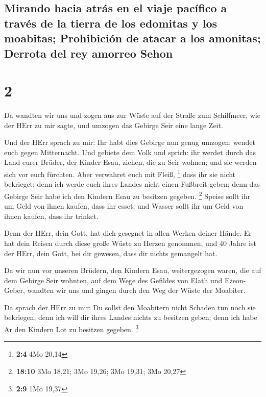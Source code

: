 \hypertarget{mirando-hacia-atruxe1s-en-el-viaje-pacuxedfico-a-travuxe9s-de-la-tierra-de-los-edomitas-y-los-moabitas-prohibiciuxf3n-de-atacar-a-los-amonitas-derrota-del-rey-amorreo-sehon}{%
\subsection{Mirando hacia atrás en el viaje pacífico a través de la
tierra de los edomitas y los moabitas; Prohibición de atacar a los
amonitas; Derrota del rey amorreo
Sehon}\label{mirando-hacia-atruxe1s-en-el-viaje-pacuxedfico-a-travuxe9s-de-la-tierra-de-los-edomitas-y-los-moabitas-prohibiciuxf3n-de-atacar-a-los-amonitas-derrota-del-rey-amorreo-sehon}}

\hypertarget{section-1}{%
\section{2}\label{section-1}}

 Da wandten wir uns und zogen aus zur Wüste auf der Straße
zum Schilfmeer, wie der HErr zu mir sagte, und umzogen das Gebirge Seir
eine lange Zeit.

 Und der HErr sprach zu mir:  Ihr habt dies
Gebirge nun genug umzogen; wendet euch gegen Mitternacht. 
Und gebiete dem Volk und sprich: ihr werdet durch das Land eurer Brüder,
der Kinder Esau, ziehen, die zu Seir wohnen; und sie werden sich vor
euch fürchten. Aber verwahret euch mit Fleiß, \footnote{\textbf{2:4} 4Mo
  20,14}  dass ihr sie nicht bekrieget; denn ich werde
euch ihres Landes nicht einen Fußbreit geben; denn das Gebirge Seir habe
ich den Kindern Esau zu besitzen gegeben. \footnote{\textbf{18:10} 3Mo
  18,21; 3Mo 19,26; 3Mo 19,31; 3Mo 20,27}  Speise sollt
ihr um Geld von ihnen kaufen, dass ihr esset, und Wasser sollt ihr um
Geld von ihnen kaufen, dass ihr trinket.

 Denn der HErr, dein Gott, hat dich gesegnet in allen
Werken deiner Hände. Er hat dein Reisen durch diese große Wüste zu
Herzen genommen, und 40 Jahre ist der HErr, dein Gott, bei dir gewesen,
dass dir nichts gemangelt hat.

 Da wir nun vor unseren Brüdern, den Kindern Esau,
weitergezogen waren, die auf dem Gebirge Seir wohnten, auf dem Wege des
Gefildes von Elath und Ezeon-Geber, wandten wir uns und gingen durch den
Weg der Wüste der Moabiter.

 Da sprach der HErr zu mir: Du sollst den Moabitern nicht
Schaden tun noch sie bekriegen; denn ich will dir ihres Landes nichts zu
besitzen geben; denn ich habe Ar den Kindern Lot zu besitzen gegeben.
\footnote{\textbf{2:9} 1Mo 19,37}

